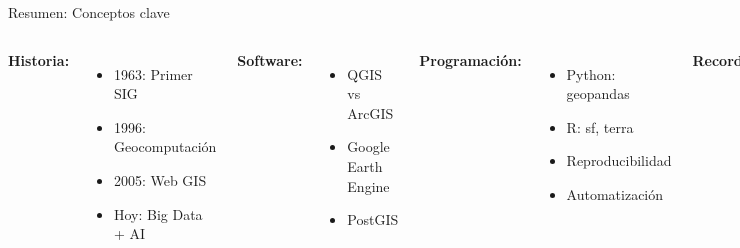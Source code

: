 \documentclass[10pt]{beamer}
\begin{document}
\begin{frame}{Resumen: Conceptos clave}
    \begin{columns}
        \textbf{Historia:}
        \begin{itemize}
            \item 1963: Primer SIG
            \item 1996: Geocomputación
            \item 2005: Web GIS
            \item Hoy: Big Data + AI
        \end{itemize}
        
        \textbf{Software:}
        \begin{itemize}
            \item QGIS vs ArcGIS
            \item Google Earth Engine
            \item PostGIS
        \end{itemize}
        
        \textbf{Programación:}
        \begin{itemize}
            \item Python: geopandas
            \item R: sf, terra
            \item Reproducibilidad
            \item Automatización
        \end{itemize}
        
        \textbf{Recordar:}
        \begin{itemize}
            \item Open source viable
            \item Python en industria
            \item R para estadística
        \end{itemize}
    \end{columns}
\end{frame}
\end{document}
